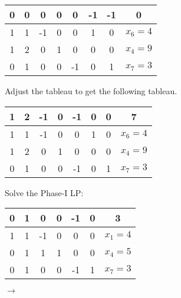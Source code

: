 \documentclass[12pt]{article}
\begin{document}
\begin{enumerate}
\begin{enumerate}
                        \begin{table}[H]
                              \centering
                              \begin{tabular}{ccccccc|c}
                                    0 & 0 & 0  & 0 & 0  & -1 & -1 & 0       \\
                                    \hline
                                    1 & 1 & -1 & 0 & 0  & 1  & 0  & $x_6=4$ \\
                                    1 & 2 & 0  & 1 & 0  & 0  & 0  & $x_4=9$ \\
                                    0 & 1 & 0  & 0 & -1 & 0  & 1  & $x_7=3$ \\
                              \end{tabular}
                        \end{table}
            \end{enumerate}
            Adjust the tableau to get the following tableau.
            \begin{table}[H]
                  \centering
                  \begin{tabular}{ccccccc|c}
                        1 & 2 & -1 & 0 & -1 & 0 & 0 & 7       \\
                        \hline
                        1 & 1 & -1 & 0 & 0  & 1 & 0 & $x_6=4$ \\
                        1 & 2 & 0  & 1 & 0  & 0 & 0 & $x_4=9$ \\
                        0 & 1 & 0  & 0 & -1 & 0 & 1 & $x_7=3$ \\
                  \end{tabular}
            \end{table}
            Solve the Phase-I LP:
            \begin{table}[H]
                  \centering
                  \begin{tabular}{cccccc|c}
                        0 & 1 & 0  & 0 & -1 & 0 & 3       \\
                        \hline
                        1 & 1 & -1 & 0 & 0  & 0 & $x_1=4$ \\
                        0 & 1 & 1  & 1 & 0  & 0 & $x_4=5$ \\
                        0 & 1 & 0  & 0 & -1 & 1 & $x_7=3$ \\
                  \end{tabular}
                  $\rightarrow$
                  \begin{tabular}{ccccc|c}

\end{tabular}
\end{table}
\end{enumerate}
\end{document}
